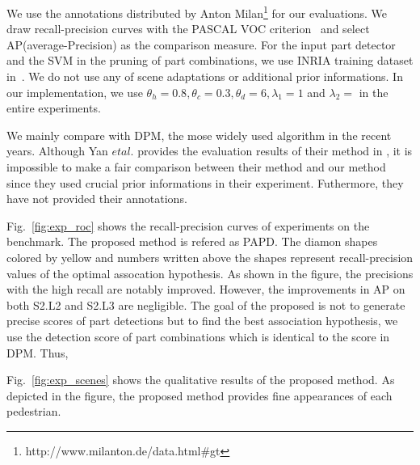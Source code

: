 \documentclass[runningheads]{llncs}
\begin{document}
We use the annotations distributed by Anton Milan\footnote{http://www.milanton.de/data.html\#gt} for our evaluations.
We draw recall-precision curves with the PASCAL VOC criterion~\cite{everingham2010pascal} and select AP(average-Precision) as the comparison measure.
For the input part detector and the SVM in the pruning of part combinations, we use INRIA training dataset in~\cite{dalal2005histograms}.
We do not use any of scene adaptations or additional prior informations.
In our implementation, we use $\theta_h = 0.8, \theta_c = 0.3, \theta_d = 6, \lambda_1 = 1$ and $\lambda_2 = $ in the entire experiments.

We mainly compare with DPM, the mose widely used algorithm in the recent years.
Although Yan $et al.$ provides the evaluation results of their method in \cite{yan2012multi}, it is impossible to make a fair comparison between their method and our method since they used crucial prior informations in their experiment.
Futhermore, they have not provided their annotations.

Fig.~\ref{fig:exp_roc} shows the recall-precision curves of experiments on the benchmark. 
The proposed method is refered as PAPD.
The diamon shapes colored by yellow and numbers written above the shapes represent recall-precision values of the optimal assocation hypothesis.
As shown in the figure, the precisions with the high recall are notably improved.
However, the improvements in AP on both S2.L2 and S2.L3 are negligible.
The goal of the proposed is not to generate precise scores of part detections but to find the best association hypothesis, we use the detection score of part combinations which is identical to the score in DPM.
Thus, 

Fig.~\ref{fig:exp_scenes} shows the qualitative results of the proposed method. As depicted in the figure, the proposed method provides fine appearances of each pedestrian.

\end{document}
